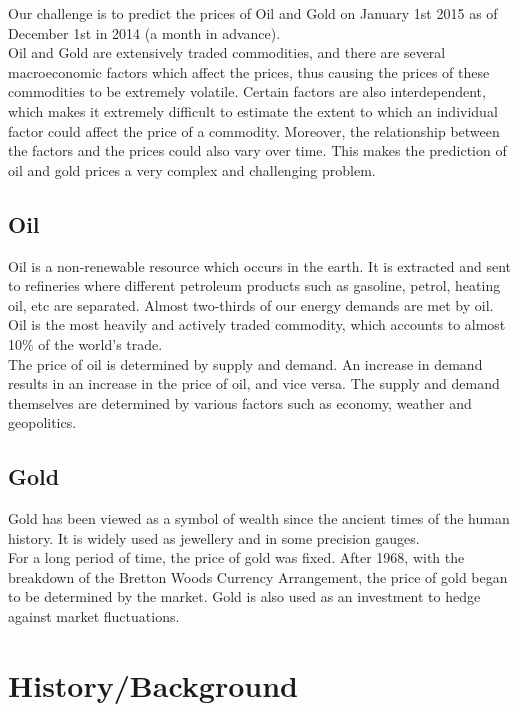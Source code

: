 \documentclass[runningheads]{llncs}
\begin{document}
Our challenge is to predict the prices of Oil and Gold on January 1st 2015 as of December 1st in 2014 (a month in advance). \\

\noindent Oil and Gold are extensively traded commodities, and there are several macroeconomic factors which affect the prices, thus causing the prices of these commodities to be extremely volatile. Certain factors are also interdependent, which makes it extremely difficult to estimate the extent to which an individual factor could affect the price of a commodity. Moreover, the relationship between the factors and the prices could also vary over time. This makes the prediction of oil and gold prices a very complex and challenging problem.


\subsection{Oil}

Oil is a non-renewable resource which occurs in the earth. It is extracted and sent to refineries where different petroleum products such as gasoline, petrol, heating oil, etc are separated. Almost two-thirds of our energy demands are met by oil. Oil is the most heavily and actively traded commodity, which accounts to almost 10\% of the world's trade.\\

\noindent The price of oil is determined by supply and demand. An increase in demand results in an increase in the price of oil, and vice versa. The supply and demand themselves are determined by various factors such as economy, weather and geopolitics. \\

\noindent 
\subsection{Gold}
Gold has been viewed as a symbol of wealth since the ancient times of the human history. It is widely used as jewellery and in some precision gauges. \\

\noindent For a long period of time, the price of gold was fixed. After 1968, with the breakdown of the Bretton Woods Currency Arrangement, the price of gold began to be determined by the market. Gold is also used as an investment to hedge against market fluctuations. 


\section{History/Background}
\end{document}
